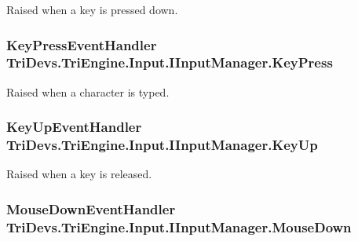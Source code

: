 Raised when a key is pressed down. 

\hypertarget{interface_tri_devs_1_1_tri_engine_1_1_input_1_1_i_input_manager_a33baf0fdb394f0a409e8e8ac4b422240}{
\subsubsection[{Key\-Press}]{\setlength{\rightskip}{0pt plus 5cm}Key\-Press\-Event\-Handler Tri\-Devs.\-Tri\-Engine.\-Input.\-I\-Input\-Manager.\-Key\-Press}}\label{interface_tri_devs_1_1_tri_engine_1_1_input_1_1_i_input_manager_a33baf0fdb394f0a409e8e8ac4b422240}


Raised when a character is typed. 

\hypertarget{interface_tri_devs_1_1_tri_engine_1_1_input_1_1_i_input_manager_aca30e6a6a1501d773f75084a1352b088}{
\subsubsection[{Key\-Up}]{\setlength{\rightskip}{0pt plus 5cm}Key\-Up\-Event\-Handler Tri\-Devs.\-Tri\-Engine.\-Input.\-I\-Input\-Manager.\-Key\-Up}}\label{interface_tri_devs_1_1_tri_engine_1_1_input_1_1_i_input_manager_aca30e6a6a1501d773f75084a1352b088}


Raised when a key is released. 

\hypertarget{interface_tri_devs_1_1_tri_engine_1_1_input_1_1_i_input_manager_a8bcb1b59f102c4132543ed1b07b6124c}{
\subsubsection[{Mouse\-Down}]{\setlength{\rightskip}{0pt plus 5cm}Mouse\-Down\-Event\-Handler Tri\-Devs.\-Tri\-Engine.\-Input.\-I\-Input\-Manager.\-Mouse\-Down}}\label{interface_tri_devs_1_1_tri_engine_1_1_input_1_1_i_input_manager_a8bcb1b59f102c4132543ed1b07b6124c}


